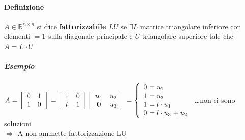 \documentclass[10pt]{book}
\begin{document}
\paragraph{Definizione} $A \in \mathbb{R}^{n \times n}$ si dice \textbf{fattorizzabile $LU$} se $\exists L$ matrice triangolare inferiore con elementi $= 1$ sulla diagonale principale e $U$ triangolare superiore tale che $A = L\cdot U$
\subparagraph{Esempio} \begin{math}
A = \left[
\begin{array}{c c}
	0 & 1\\
	1 & 0
\end{array}
\right]
= \left[
\begin{array}{c c}
	1 & 0\\
	l & 1
\end{array}
\right]
\left[
\begin{array}{c c}
	u_1 & u_2\\
	0 & u_3
\end{array}
\right]
= \left\{
\begin{array}{l}
	0 = u_1\\
	1 = u_3\\
	1 = l\cdot u_1\\
	0 = l\cdot u_3 + u_2
\end{array}
\right.
\end{math}
\ldots non ci sono soluzioni\\
$\Rightarrow$ A non ammette fattorizzazione LU
\pagebreak
\end{document}
